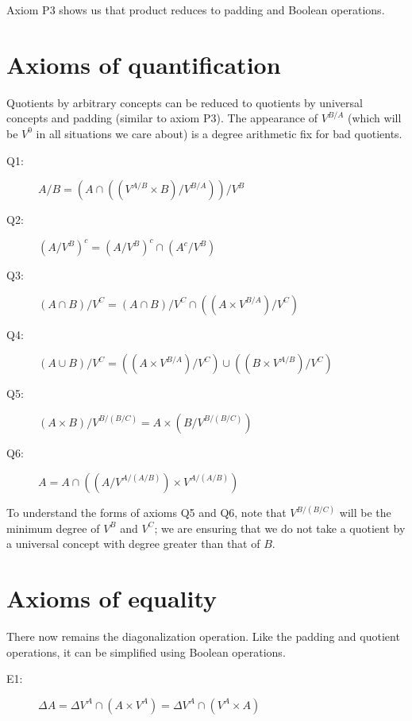 Axiom P3 shows us that product reduces to padding and Boolean
operations.

\section{Axioms of quantification}

Quotients by arbitrary concepts can be reduced to quotients by
universal concepts and padding (similar to axiom P3).  The appearance
of $V^{B/A}$ (which will be $V^0$ in all situations we care about) is
a degree arithmetic fix for bad quotients.

\begin{description}

\item[Q1:]  $A / B = (A \cap ((V^{A/B} \times B)/V^{B/A}))/V^B$

\end{description}

\begin{description}

\item[Q2:]  $(A/V^B)^c = (A/V^B)^c \cap (A^c/V^B)$

\item[Q3:]  $(A\cap B)/V^C = (A\cap B)/V^C \cap ((A\times V^{B/A})/V^C)$

\item[Q4:] $(A\cup B)/V^C = ((A\times V^{B/A}) /V^C)\cup ((B\times
V^{A/B})/V^C)$

\item[Q5:]  $(A \times B)/V^{B/(B/C)} = A \times (B/V^{B/(B/C)})$

\item[Q6:]  $A = A \cap ((A/V^{A/(A/B)})\times V^{A/(A/B)})$

\end{description}

To understand the forms of axioms Q5 and Q6, note that $V^{B/(B/C)}$
will be the minimum degree of $V^B$ and $V^C$; we are ensuring that we
do not take a quotient by a universal concept with degree greater than
that of $B$.

\section{Axioms of equality}

There now remains the diagonalization operation.  Like the padding and
quotient operations, it can be simplified using Boolean operations.

\begin{description}

\item[E1:] $\Delta A = \Delta V^A \cap (A \times V^A) = \Delta V^A
\cap (V^A \times A)$

\end{description}

